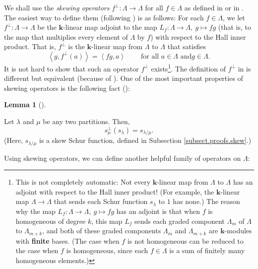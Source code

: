 \documentclass[numbers=enddot,12pt,final,onecolumn,notitlepage]{scrartcl}%
\theoremstyle{definition}
\newtheorem{lem}[theo]{Lemma}
\newenvironment{lemma}[1][]
{\begin{lem}[#1]\begin{leftbar}}
{\end{leftbar}\end{lem}}
\begin{document}
We shall use the \emph{skewing operators} $f^{\perp}:\Lambda\rightarrow
\Lambda$ for all $f\in\Lambda$ as defined in \cite[\S 2.8]{GriRei} or in
\cite[Chapter I,\ Section 5, Example 3]{Macdon95}. The easiest way to define
them (following \cite[Chapter I,\ Section 5, Example 3]{Macdon95}) is as
follows: For each $f\in\Lambda$, we let $f^{\perp}:\Lambda\rightarrow\Lambda$
be the $\mathbf{k}$-linear map adjoint to the map $L_{f}:\Lambda
\rightarrow\Lambda,\ g\mapsto fg$ (that is, to the map that multiplies every
element of $\Lambda$ by $f$) with respect to the Hall inner product. That is,
$f^{\perp}$ is the $\mathbf{k}$-linear map from $\Lambda$ to $\Lambda$ that
satisfies
\[
\left\langle g,f^{\perp}\left(  a\right)  \right\rangle =\left\langle
fg,a\right\rangle \ \ \ \ \ \ \ \ \ \ \text{for all }a\in\Lambda\text{ and
}g\in\Lambda.
\]
It is not hard to show that such an operator $f^{\perp}$ exists\footnote{This
is not completely automatic: Not every $\mathbf{k}$-linear map from $\Lambda$
to $\Lambda$ has an adjoint with respect to the Hall inner product! (For
example, the $\mathbf{k}$-linear map $\Lambda\rightarrow\Lambda$ that sends
each Schur function $s_{\lambda}$ to $1$ has none.) The reason why the map
$L_{f}:\Lambda\rightarrow\Lambda,\ g\mapsto fg$ has an adjoint is that when
$f$ is homogeneous of degree $k$, this map $L_{f}$ sends each graded component
$\Lambda_{m}$ of $\Lambda$ to $\Lambda_{m+k}$, and both of these graded
components $\Lambda_{m}$ and $\Lambda_{m+k}$ are $\mathbf{k}$-modules with
\textbf{finite} bases. (The case when $f$ is not homogeneous can be reduced to
the case when $f$ is homogeneous, since each $f\in\Lambda$ is a sum of
finitely many homogeneous elements.)}. The definition of $f^{\perp}$ in
\cite[\S 2.8]{GriRei} is different but equivalent (because of
\cite[Proposition 2.8.2(i)]{GriRei}). One of the most important properties of
skewing operators is the following fact (\cite[(2.8.2)]{GriRei}):

\begin{lemma}
\label{lem.skewing.schur}Let $\lambda$ and $\mu$ be any two partitions. Then,%
\begin{equation}
s_{\mu}^{\perp}\left(  s_{\lambda}\right)  =s_{\lambda/\mu}.
\label{pf.lem.Bmhn.skew}%
\end{equation}
(Here, $s_{\lambda/\mu}$ is a skew Schur function, defined in Subsection
\ref{subsect.proofs.skew}.)
\end{lemma}

Using skewing operators, we can define another helpful family of operators on
$\Lambda$:
\end{document}
